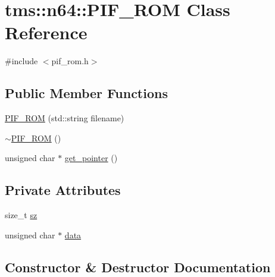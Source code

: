 \hypertarget{classtms_1_1n64_1_1_p_i_f___r_o_m}{}\section{tms\+:\+:n64\+:\+:P\+I\+F\+\_\+\+R\+OM Class Reference}
\label{classtms_1_1n64_1_1_p_i_f___r_o_m}


{\ttfamily \#include $<$pif\+\_\+rom.\+h$>$}

\subsection*{Public Member Functions}
\begin{DoxyCompactItemize}
\item 
\hyperlink{classtms_1_1n64_1_1_p_i_f___r_o_m_aef2b8409e2b3308e5f20800f0ce7a956}{P\+I\+F\+\_\+\+R\+OM} (std\+::string filename)
\item 
\hyperlink{classtms_1_1n64_1_1_p_i_f___r_o_m_a9bce75f2986d54205455fce62b1f580a}{$\sim$\+P\+I\+F\+\_\+\+R\+OM} ()
\item 
unsigned char $\ast$ \hyperlink{classtms_1_1n64_1_1_p_i_f___r_o_m_a107e89aebad2a0c1960040da97fe2f3a}{get\+\_\+pointer} ()
\end{DoxyCompactItemize}
\subsection*{Private Attributes}
\begin{DoxyCompactItemize}
\item 
size\+\_\+t \hyperlink{classtms_1_1n64_1_1_p_i_f___r_o_m_a52039199eee4133c3af6f04747a9a527}{sz}
\item 
unsigned char $\ast$ \hyperlink{classtms_1_1n64_1_1_p_i_f___r_o_m_a63e13805fbf55e8317fe195fe7e77eac}{data}
\end{DoxyCompactItemize}


\subsection{Constructor \& Destructor Documentation}
\mbox{\label{classtms_1_1n64_1_1_p_i_f___r_o_m_aef2b8409e2b3308e5f20800f0ce7a956}} 
